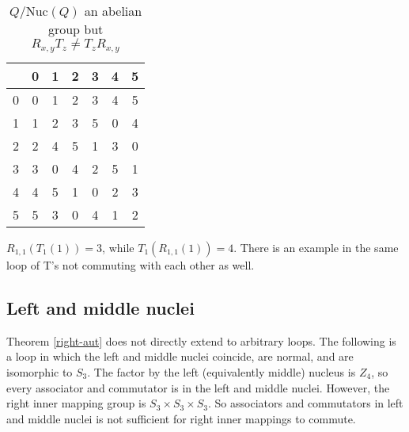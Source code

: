 \documentclass[12pt]{report}
\theoremstyle{definition}
\newcommand{\nuc}{\text{Nuc}}       %
\begin{document}
\begin{table}[H]
  \centering
  \begin{tabular}{c | c c c c c c}
    & 0 & 1 & 2 & 3 & 4 & 5\\
    \hline\hline
    0 & 0 & 1 & 2 & 3 & 4 & 5\\
    1 & 1 & 2 & 3 & 5 & 0 & 4\\
    2 & 2 & 4 & 5 & 1 & 3 & 0\\
    3 & 3 & 0 & 4 & 2 & 5 & 1\\
    4 & 4 & 5 & 1 & 0 & 2 & 3\\
    5 & 5 & 3 & 0 & 4 & 1 & 2
  \end{tabular}
  \caption{$Q/\nuc(Q)$ an abelian group but $R_{x, y} T_z \neq T_z R_{x, y}$}
\end{table}

$R_{1, 1}(T_1 (1)) = 3$, while $T_1(R_{1, 1}(1)) = 4$. There is an example in the same loop
  of T's not commuting with each other as well.

\subsection{Left and middle nuclei}

Theorem \ref{right-aut} does not directly extend to arbitrary loops. The following is a loop
  in which the left and middle nuclei coincide, are normal, and are isomorphic to $S_3$.
  The factor by the left (equivalently middle) nucleus is $Z_4$, so every associator and
  commutator is in the left and middle nuclei. However, the right inner mapping group is
  $S_3 \times S_3 \times S_3$. So associators and commutators in left and middle nuclei is
  not sufficient for right inner mappings to commute.
\end{document}
